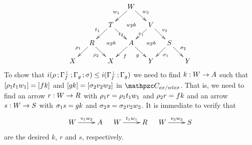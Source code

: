 \[
\vcenter{\xymatrix@C=3ex@R=3ex{
&&& W \ar[ld]_-{w_1} \ar[rd]^-{w_2} \ar@{}[dd]|{wpb} &&& \\
&& T\ar[ld]_-{t_1} \ar[rd]|{t_2} \ar@{}[dd]|{wpb} && V\ar[ld]|{v_1} \ar[rd]^-{v_2} \ar@{}[dd]|{wpb}&& \\  
&R\ar[ld]_-{\eqrelr_1}\ar[rd]_-{\eqrelr_2} && A \ar[ld]^-{f} \ar[rd]_-{g} && S \ar[ld]^-{\eqrels_1}\ar[rd]^-{\eqrels_2}& \\ 
X&& X && Y &&Y
}}
\]
To show that $i(\rho\mathop{\mathbf{;}}\Gamma_{f}^{\bot}\mathop{\mathbf{;}}\Gamma_{g}\mathop{\mathbf{;}}\sigma)\leq i(\Gamma_{f}^{\bot}\mathop{\mathbf{;}}\Gamma_{g})$ we need to find $\fun{k}{W}{A}$ such that $[\rho_1t_1w_1]=[fk]$ and $[gk]=[\sigma_2v_2w_2]$ in $\CC_{ex/wlex}$. That is, we need to find an arrow $\fun{r}{W}{R}$   with $\rho_1r=\rho_1t_1w_1$ and $\rho_2r=fk$
and an arrow  $\fun{s}{W}{S}$ with 
$\sigma_1s=gk$ and $\sigma_2s=\sigma_2v_2w_2$. It is immediate to verify that 
\[
\xymatrix{W\ar[r]^-{v_1w_2}&A}\quad \xymatrix{W\ar[r]^-{t_1w_1}&R}
\quad \xymatrix{W\ar[r]^-{v_2w_2}&S}
\]
are the desired $k$,
 $r$ and $s$, respectively.
